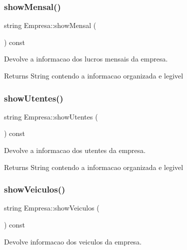 \subsubsection{\texorpdfstring{show\+Mensal()}{showMensal()}}
{\footnotesize\ttfamily string Empresa\+::show\+Mensal (\begin{DoxyParamCaption}{ }\end{DoxyParamCaption}) const}



Devolve a informacao dos lucros mensais da empresa. 

\begin{DoxyReturn}{Returns}
String contendo a informacao organizada e legivel 
\end{DoxyReturn}
\mbox{\label{class_empresa_acd94b5de5f758663768d4c4af41b0039}} 
\subsubsection{\texorpdfstring{show\+Utentes()}{showUtentes()}}
{\footnotesize\ttfamily string Empresa\+::show\+Utentes (\begin{DoxyParamCaption}{ }\end{DoxyParamCaption}) const}



Devolve a informacao dos utentes da empresa. 

\begin{DoxyReturn}{Returns}
String contendo a informacao organizada e legivel 
\end{DoxyReturn}
\mbox{\label{class_empresa_a5a6d0c8a801a77a5bf48e32a96890c61}} 
\subsubsection{\texorpdfstring{show\+Veiculos()}{showVeiculos()}}
{\footnotesize\ttfamily string Empresa\+::show\+Veiculos (\begin{DoxyParamCaption}{ }\end{DoxyParamCaption}) const}



Devolve informacao dos veiculos da empresa. 

